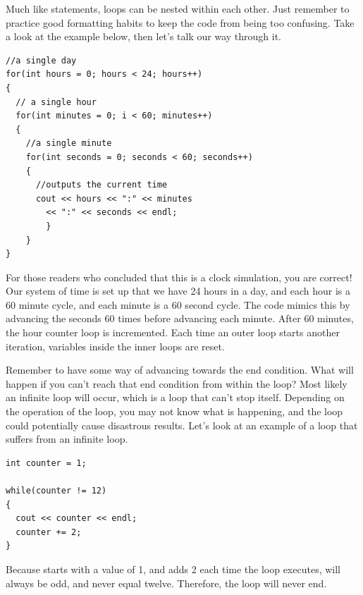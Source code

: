 
Much like  statements, loops can be nested within each other.
Just remember to practice good formatting habits to keep the code from being too confusing.
Take a look at the example below, then let's talk our way through it. \nopagebreak[4]
 
\noindent\begin{minipage}{\linewidth}\begin{lstlisting}
//a single day
for(int hours = 0; hours < 24; hours++)	
{
  // a single hour
  for(int minutes = 0; i < 60; minutes++)	
  {
    //a single minute 
    for(int seconds = 0; seconds < 60; seconds++) 	
    {
      //outputs the current time
      cout << hours << ":" << minutes
        << ":" << seconds << endl;
		}
	}
}
\end{lstlisting}\end{minipage}

For those readers who concluded that this is a clock simulation, you are correct!
Our system of time is set up that we have 24 hours in a day, and each hour is a 60 minute cycle, and each minute is a 60 second cycle.
The code mimics this by advancing the seconds 60 times before advancing each minute.
After 60 minutes, the hour counter loop is incremented. Each time an outer loop starts another iteration, variables inside the inner loops are reset.


Remember to have some way of advancing towards the end condition.
What will happen if you can't reach that end condition from within the loop?
Most likely an infinite loop will occur, which is a loop that can't stop itself.
Depending on the operation of the loop, you may not know what is happening, and the loop could potentially cause disastrous results.
Let's look at an example of a  loop that suffers from an infinite loop.

\noindent\begin{minipage}{\linewidth}\begin{lstlisting}
int counter = 1;

while(counter != 12)
{
  cout << counter << endl;
  counter += 2;
}
\end{lstlisting}\end{minipage}

Because  starts with a value of 1, and adds 2 each time the loop executes,  will always be odd, and never equal twelve.
Therefore, the loop will never end.

